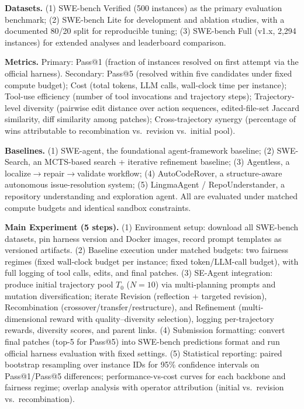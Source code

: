 \begin{tcolorbox}[
	title={Box 12: Case 1 --- GPT-5.2 CoT+Search Output},
	colback=blue!3!white,
	colframe=blue!30!black,
	colbacktitle=blue!15!white,
	coltitle=black,
	fonttitle=\bfseries,
	arc=3mm,
	boxrule=0.8pt,
	breakable
]
\small
\textbf{Datasets.} (1) SWE-bench Verified (500 instances) as the primary evaluation benchmark; (2) SWE-bench Lite for development and ablation studies, with a documented 80/20 split for reproducible tuning; (3) SWE-bench Full (v1.x, 2,294 instances) for extended analyses and leaderboard comparison.

\smallskip
\textbf{Metrics.} Primary: Pass@1 (fraction of instances resolved on first attempt via the official harness). Secondary: Pass@5 (resolved within five candidates under fixed compute budget); Cost (total tokens, LLM calls, wall-clock time per instance); Tool-use efficiency (number of tool invocations and trajectory steps); Trajectory-level diversity (pairwise edit distance over action sequences, edited-file-set Jaccard similarity, diff similarity among patches); Cross-trajectory synergy (percentage of wins attributable to recombination vs.\ revision vs.\ initial pool).

\smallskip
\textbf{Baselines.} (1) SWE-agent, the foundational agent-framework baseline; (2) SWE-Search, an MCTS-based search + iterative refinement baseline; (3) Agentless, a localize$\rightarrow$repair$\rightarrow$validate workflow; (4) AutoCodeRover, a structure-aware autonomous issue-resolution system; (5) LingmaAgent / RepoUnderstander, a repository understanding and exploration agent. All are evaluated under matched compute budgets and identical sandbox constraints.

\smallskip
\textbf{Main Experiment (5 steps).} (1) Environment setup: download all SWE-bench datasets, pin harness version and Docker images, record prompt templates as versioned artifacts. (2) Baseline execution under matched budgets: two fairness regimes (fixed wall-clock budget per instance; fixed token/LLM-call budget), with full logging of tool calls, edits, and final patches. (3) SE-Agent integration: produce initial trajectory pool $T_0$ ($N=10$) via multi-planning prompts and mutation diversification; iterate Revision (reflection + targeted revision), Recombination (crossover/transfer/restructure), and Refinement (multi-dimensional reward with quality--diversity selection), logging per-trajectory rewards, diversity scores, and parent links. (4) Submission formatting: convert final patches (top-5 for Pass@5) into SWE-bench predictions format and run official harness evaluation with fixed settings. (5) Statistical reporting: paired bootstrap resampling over instance IDs for 95\% confidence intervals on Pass@1/Pass@5 differences; performance-vs-cost curves for each backbone and fairness regime; overlap analysis with operator attribution (initial vs.\ revision vs.\ recombination).


\end{tcolorbox}
